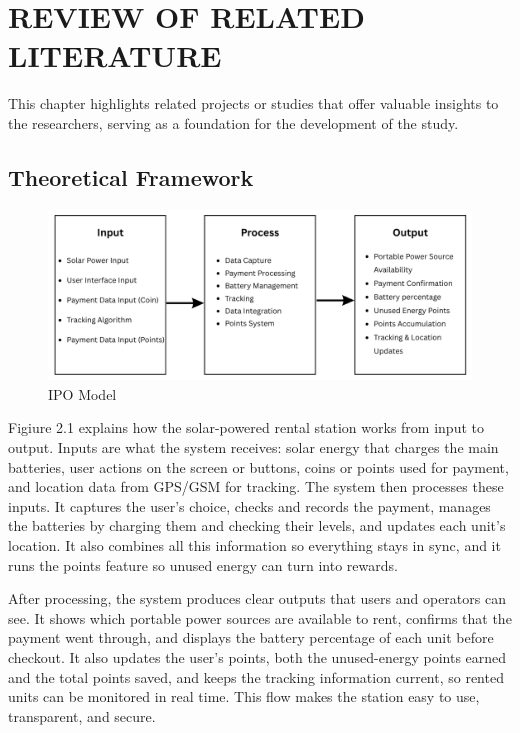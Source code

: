 \chapter{REVIEW OF RELATED LITERATURE}
{\baselineskip
This chapter highlights related projects or studies that offer valuable insights to the researchers, serving as a foundation for the development of the study.


\section{Theoretical Framework}

\begin{figure}[H]
	\centering
	\caption{IPO Model}
	\label{fig:theoretical}
	\includegraphics[width=1\textwidth]{figures/theoretical.png}
\end{figure}

Figiure 2.1 explains how the solar-powered rental station works from input to output. Inputs are what the system receives: solar energy that charges the main batteries, user actions on the screen or buttons, coins or points used for payment, and location data from GPS/GSM for tracking. The system then processes these inputs. It captures the user’s choice, checks and records the payment, manages the batteries by charging them and checking their levels, and updates each unit’s location. It also combines all this information so everything stays in sync, and it runs the points feature so unused energy can turn into rewards.

After processing, the system produces clear outputs that users and operators can see. It shows which portable power sources are available to rent, confirms that the payment went through, and displays the battery percentage of each unit before checkout. It also updates the user’s points, both the unused-energy points earned and the total points saved, and keeps the tracking information current, so rented units can be monitored in real time. This flow makes the station easy to use, transparent, and secure.


}
